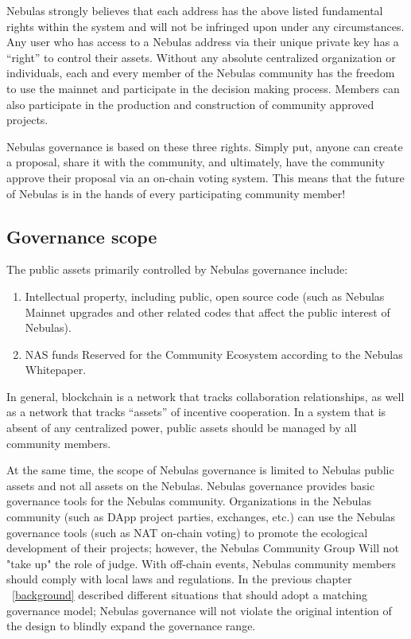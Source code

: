 Nebulas strongly believes that each address has the above listed fundamental rights within the system and will not be infringed upon under any circumstances. Any user who has access to a Nebulas address via their unique private key has a “right” to control their assets. Without any absolute centralized organization or individuals, each and every member of the Nebulas community has the freedom to use the mainnet and participate in the decision making process. Members can also participate in the production and construction of community approved projects. 

Nebulas governance is based on these three rights. Simply put, anyone can create a proposal, share it with the community, and ultimately, have the community approve their proposal via an on-chain voting system. This means that the future of Nebulas is in the hands of every participating community member!

\subsection{Governance scope}


The public assets primarily controlled by Nebulas governance include:

\begin{enumerate}
	\item Intellectual property, including public, open source code (such as Nebulas Mainnet upgrades and other related codes that affect the public interest of Nebulas).
	\item NAS funds Reserved for the Community Ecosystem according to the Nebulas Whitepaper.
\end{enumerate}

In general, blockchain is a network that tracks collaboration relationships, as well as a network that tracks “assets” of incentive cooperation. In a system that is absent of any centralized power, public assets should be managed by all community members.

At the same time, the scope of Nebulas governance is limited to Nebulas public assets and not all assets on the Nebulas. Nebulas governance provides basic governance tools for the Nebulas community. Organizations in the Nebulas community (such as DApp project parties, exchanges, etc.) can use the Nebulas governance tools (such as NAT on-chain voting) to promote the ecological development of their projects; however, the Nebulas Community Group Will not "take up" the role of judge. With off-chain events, Nebulas community members should comply with local laws and regulations. In the previous chapter ~\ref{background} described different situations that should adopt a matching governance model; Nebulas governance will not violate the original intention of the design to blindly expand the governance range.


